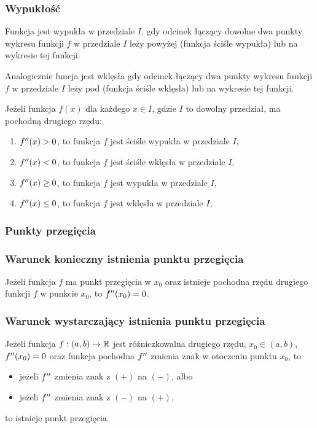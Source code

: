 \documentclass[../Matematyka.tex]{subfiles}
\begin{document}
    \subsubsection{Wypukłość}
    Funkcja jest wypukła w przedziale \(I\), gdy odcinek łączący dowolne dwa punkty wykresu funkcji \(f\) w przedziale \(I\) leży powyżej (funkcja ściśle wypukła) lub na wykresie tej funkcji.

    Analogicznie funcja jest wklęsła gdy odcinek łączący dwa punkty wykresu funkcji \(f\) w przedziale \(I\) leży pod (funkcja ściśle wklęsła) lub na wykresie tej funkcji.

    Jeżeli funkcja \(f(x)\) dla każdego \(x \in I\), gdzie \(I\) to dowolny przedział, ma pochodną drugiego rzędu:
    \begin{enumerate}
        \item \(f^{\prime\prime}(x) > 0\), to funkcja \(f\) jest ściśle wypukła w przedziale \(I\),
        \item \(f^{\prime\prime}(x) < 0\), to funkcja \(f\) jest ściśle wklęsła w przedziale \(I\),
        \item \(f^{\prime\prime}(x) \geq 0\), to funkcja \(f\) jest wypukła w przedziale \(I\),
        \item \(f^{\prime\prime}(x) \leq 0\), to funkcja \(f\) jest wklęsła w przedziale \(I\),
    \end{enumerate}

    \subsubsection{Punkty przegięcia}
    \subsubsection*{Warunek konieczny istnienia punktu przegięcia}
    Jeżeli funkcja \(f\) ma punkt przegięcia w \(x_0\) oraz istnieje pochodna rzędu drugiego funkcji \(f\) w punkcie \(x_0\), to \(f^{\prime\prime}(x_0) = 0\).
    \subsubsection*{Warunek wystarczający istnienia punktu przegięcia}
    Jeżeli funkcja \(f:(a, b) \rightarrow \mathbb{R}\) jest różniczkowalna drugiego rzędu, \(x_0 \in (a,b)\), \(f^{\prime\prime}(x_0) = 0\) oraz funkcja pochodna \(f^{\prime\prime}\) zmienia znak w otoczeniu punktu \(x_0\), to
    \begin{itemize}
        \item jeżeli \(f^{\prime\prime}\) zmienia znak z \((+)\) na \((-)\), albo
        \item jeżeli \(f^{\prime\prime}\) zmienia znak z \((-)\) na \((+)\),
    \end{itemize}
    to istnieje punkt przegięcia.
\end{document}
